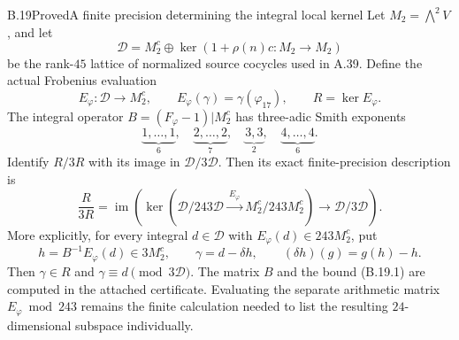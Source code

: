 \begin{statement}{B.19}{Proved}{A finite precision determining the integral local kernel}
Let $M_2=\bigwedge^2V$, and let
\[
 \mathcal D=M_2^c\oplus
       \ker(1+\rho(n)c:M_2\longrightarrow M_2)
\]
be the rank-$45$ lattice of normalized source cocycles
used in A.39. Define the actual Frobenius evaluation
\[
 E_\varphi:\mathcal D\longrightarrow M_2^c,
 \qquad E_\varphi(\gamma)=\gamma(\varphi_{17}),
 \qquad R=\ker E_\varphi.
\]
The integral operator
$B=(F_\varphi-1)|M_2^c$ has three-adic Smith
exponents
\[
 \underbrace{1,\ldots,1}_{6},\quad
 \underbrace{2,\ldots,2}_{7},\quad
 \underbrace{3,3}_{2},\quad
 \underbrace{4,\ldots,4}_{6}.
                                                               \tag{B.19.1}
\]
Identify $R/3R$ with its image in $\mathcal D/3\mathcal D$.
Then its exact finite-precision description is
\[
 \frac{R}{3R}
 =\operatorname{im}\left(
 \ker\left(
 \mathcal D/243\mathcal D
       \xrightarrow{\ E_\varphi\ }
 M_2^c/243M_2^c\right)
 \longrightarrow\mathcal D/3\mathcal D\right).
                                                               \tag{B.19.2}
\]
More explicitly, for every integral $d\in\mathcal D$
with $E_\varphi(d)\in243M_2^c$, put
\[
 h=B^{-1}E_\varphi(d)\in3M_2^c,
 \qquad \gamma=d-\delta h,
 \qquad (\delta h)(g)=g(h)-h.
                                                               \tag{B.19.3}
\]
Then $\gamma\in R$ and $\gamma\equiv d\pmod{3\mathcal D}$.
The matrix $B$ and the bound (B.19.1) are computed
in the attached certificate. Evaluating the separate
arithmetic matrix $E_\varphi\bmod243$ remains the
finite calculation needed to list the resulting
$24$-dimensional subspace individually.
\end{statement}
